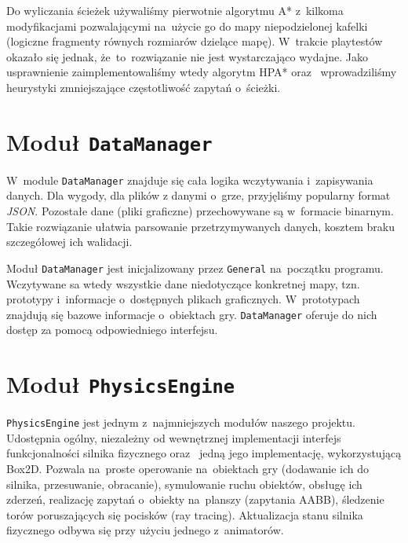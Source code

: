 \documentclass[licencjacka]{pracamgr}
\begin{document}
      Do wyliczania ścieżek używaliśmy pierwotnie algorytmu A*\cite{A*} z~kilkoma modyfikacjami pozwalającymi na~użycie go do mapy
      niepodzielonej kafelki (logiczne fragmenty równych rozmiarów dzielące mapę). W~trakcie playtestów okazało się jednak,
      że~to~rozwiązanie nie jest wystarczająco wydajne. Jako usprawnienie zaimplementowaliśmy wtedy algorytm HPA*\cite{HPA} oraz~
      wprowadziliśmy heurystyki zmniejszające częstotliwość zapytań o~ścieżki.


  \section{Moduł \texttt{DataManager}}
    W~module \texttt{DataManager} znajduje się cała logika wczytywania i~zapisywania danych. Dla wygody, dla plików z
    danymi o~grze, przyjęliśmy popularny format \emph{JSON}. Pozostałe dane (pliki graficzne) przechowywane są w~formacie
    binarnym. Takie rozwiązanie ułatwia parsowanie przetrzymywanych danych, kosztem braku szczegółowej ich walidacji.

    Moduł \texttt{DataManager} jest inicjalizowany przez \texttt{General} na~początku programu. Wczytywane sa wtedy wszystkie dane
    niedotyczące konkretnej mapy, tzn. prototypy i~informacje o~dostępnych plikach graficznych. W~prototypach znajdują się 
    bazowe informacje o~obiektach gry. \texttt{DataManager} oferuje do nich dostęp za pomocą odpowiedniego interfejsu.

  \section{Moduł \texttt{PhysicsEngine}}
    \texttt{PhysicsEngine} jest jednym z~najmniejszych modułów naszego projektu. Udostępnia ogólny, niezależny od
    wewnętrznej implementacji interfejs funkcjonalności silnika fizycznego oraz~ jedną jego implementację, wykorzystującą Box2D.
    Pozwala na~proste operowanie na~obiektach gry (dodawanie ich do silnika, przesuwanie, obracanie), symulowanie ruchu obiektów,
    obsługę ich zderzeń, realizację zapytań o~obiekty na~planszy (zapytania AABB), śledzenie torów poruszających się pocisków (ray tracing).
    Aktualizacja stanu silnika fizycznego odbywa się przy użyciu jednego z~animatorów.
\end{document}
